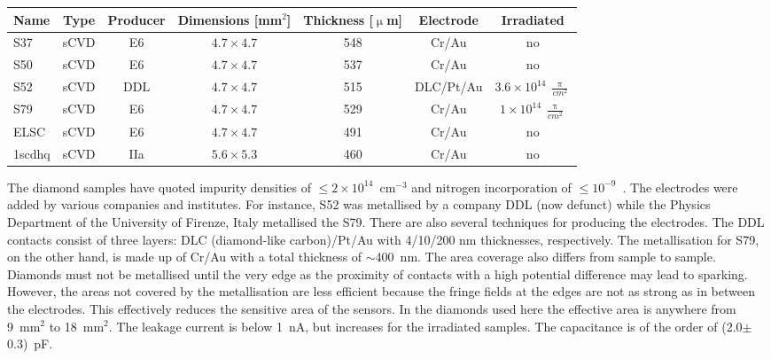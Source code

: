 \begin{footnotesize}
\begin{center}
\begin{tabular}{   l  c  c  c  c c c }
\hline
Name & Type &Producer & Dimensions [mm$^2$] & Thickness [$\upmu$m] & Electrode & Irradiated \\
\hline
S37 & sCVD & E6 & $4.7\times4.7$ & 548 & Cr/Au & no \\
S50 & sCVD & E6 & $4.7\times4.7$ & 537 & Cr/Au & no \\
S52 & sCVD & DDL & $4.7\times4.7$ & 515 & DLC/Pt/Au & $3.6\times10^{14}~\frac{\uppi}{cm^{2}}$ \\
S79 & sCVD & E6 & $4.7\times4.7$ & 529 & Cr/Au & $1\times10^{14}~\frac{\uppi}{cm^{2}}$ \\
ELSC & sCVD & E6 & $4.7\times4.7$ & 491 & Cr/Au & no \\
1scdhq & sCVD & IIa & $5.6\times5.3$ & 460 & Cr/Au & no \\
\hline
\end{tabular}
\label{tab:diamsamp}
\end{center}
\end{footnotesize}

The diamond samples have quoted impurity densities of $\leq2\times10^{14}$~cm$^{-3}$ and nitrogen incorporation of $\leq10^{-9}$~\cite{Jansen:1956431}. The electrodes were added by various companies and institutes. For instance, S52 was metallised by a company DDL (now defunct) while the Physics Department of the University of Firenze, Italy metallised the S79. There are also several techniques for producing the electrodes. The DDL contacts consist of three layers: DLC (diamond-like carbon)/Pt/Au with 4/10/200 nm thicknesses, respectively. The metallisation for S79, on the other hand, is made up of Cr/Au with a total thickness of $\sim$400~nm. The area coverage also differs from sample to sample. Diamonds must not be metallised until the very edge as the proximity of contacts with a high potential difference may lead to sparking. However, the areas not covered by the metallisation are less efficient because the fringe fields at the edges are not as strong as in between the electrodes. This effectively reduces the sensitive area of the sensors. In the diamonds used here the effective area is anywhere from 9~mm$^2$ to 18~mm$^2$. The leakage current is below 1~nA, but increases for the irradiated samples. The capacitance is of the order of (2.0$\pm$0.3)~pF.


